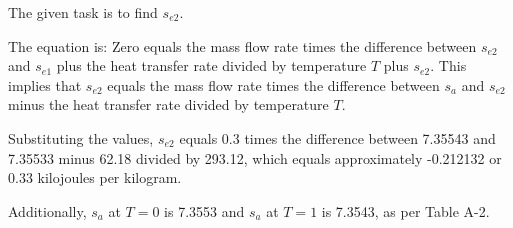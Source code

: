 The given task is to find \( s_{e2} \).

The equation is:
Zero equals the mass flow rate times the difference between \( s_{e2} \) and \( s_{e1} \) plus the heat transfer rate divided by temperature \( T \) plus \( s_{e2} \). This implies that \( s_{e2} \) equals the mass flow rate times the difference between \( s_{a} \) and \( s_{e2} \) minus the heat transfer rate divided by temperature \( T \).

Substituting the values, \( s_{e2} \) equals 0.3 times the difference between 7.35543 and 7.35533 minus 62.18 divided by 293.12, which equals approximately -0.212132 or 0.33 kilojoules per kilogram.

Additionally, \( s_{a} \) at \( T = 0 \) is 7.3553 and \( s_{a} \) at \( T = 1 \) is 7.3543, as per Table A-2.